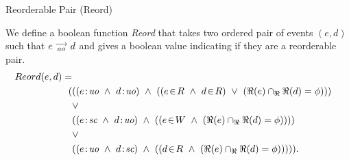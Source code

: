 \begin{definition}{Reorderable Pair (Reord)}
    \label{Reord}
    
    We define a boolean function \emph{Reord} that takes two ordered pair of events $(e,d)$ such that $e\stackrel{\longrightarrow}{_{ao}}d$ and gives a boolean value indicating if they are a reorderable pair\footnotemark.   
    \begin{align*}
        Reord(e,d) = \\
        (
        &((\et{e}{uo} \ \wedge \ \et{d}{uo}) \ \wedge \ 
                (   
                    (\event{e}{R} \ \wedge \ \event{d}{R}) \ \vee \ 
                    (\Re(e) \cap_\Re \Re(d) = \phi) 
                )
        ) \\ &\vee \\
        &((\et{e}{sc} \ \wedge \ \et{d}{uo}) \ \wedge \ 
                (
                    (\event{e}{W} \ \wedge \ (\Re(e) \cap_\Re \Re(d) = \phi)) 
                )
        ) \\ &\vee \\
        &((\et{e}{uo} \ \wedge \ \et{d}{sc}) \ \wedge \ 
                (
                    (\event{d}{R} \ \wedge \ (\Re(e) \cap_\Re \Re(d) = \phi)) 
                )
        )
        ).
    \end{align*}

\end{definition}


